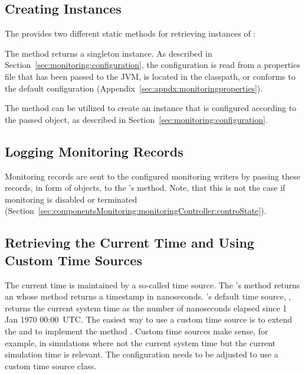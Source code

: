 \subsection{Creating  Instances}\label{sec:componentsMonitoring:monitoringController:factory}

The  provides two different static methods for retrieving instances of %
:\\

\begin{compactenum}
 \item The method  returns a singleton instance. %
As described in Section~\ref{sec:monitoring:configuration}, the configuration is read from %
a properties file that has been passed to the JVM, is located in the classpath, or %
conforms to the default configuration (Appendix~\ref{sec:appdx:monitoringproperties}). %
 \item The method  can be utilized to create %
an instance that is configured according to the passed  object, %
as described in Section~\ref{sec:monitoring:configuration}.
\end{compactenum}

\subsection{Logging Monitoring Records}\label{sec:componentsMonitoring:monitoringController:logging}

Monitoring records are sent to the configured monitoring writers by passing %
these records, in form of  objects, to the %
's  method.  %
Note, that this is not the case if monitoring is disabled or terminated (Section~\ref{sec:componentsMonitoring:monitoringController:controState}).

\subsection{Retrieving the Current Time and Using Custom Time Sources}\label{sec:componentsMonitoring:monitoringController:getTime}

The current time is maintained by a so-called time source. The 's method %
 returns an  whose method %
 returns a timestamp in nanoseconds. \Kieker{}'s default %
time source, , returns the current system %
time as the number of nanoseconds elapsed since 1 Jan 1970 00:00~UTC. %
The easiest way to use a custom time source is to extend the  and %
to implement the method . Custom time sources make sense, for example, %
in simulations where not the current system time but the current simulation time is %
relevant. The configuration needs to be adjusted to use a custom time source class. %


